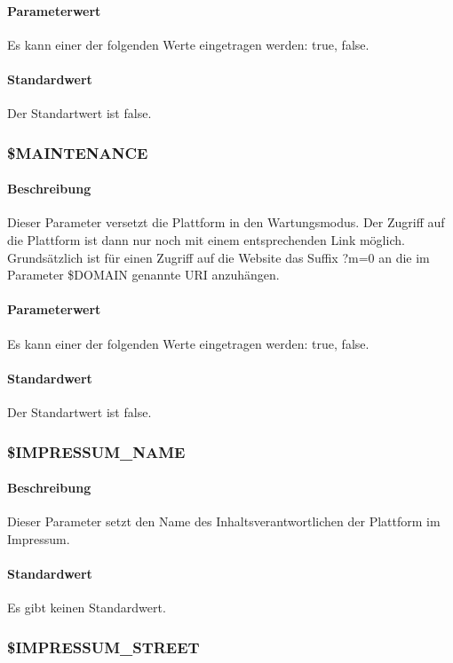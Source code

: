 \paragraph{Parameterwert}Es kann einer der folgenden Werte eingetragen werden: {\glqq true\grqq}, {\glqq false\grqq}.
\paragraph{Standardwert}Der Standartwert ist {\glqq false\grqq}.

\subsubsection{\$MAINTENANCE}
\paragraph{Beschreibung}Dieser Parameter versetzt die Plattform in den Wartungsmodus. Der Zugriff auf die Plattform ist dann nur noch mit einem entsprechenden Link möglich. Grundsätzlich ist für einen Zugriff auf die Website das Suffix {\glqq ?m=0\grqq} an die im Parameter {\glqq \$DOMAIN\grqq} genannte URI anzuhängen.
\paragraph{Parameterwert}Es kann einer der folgenden Werte eingetragen werden: {\glqq true\grqq}, {\glqq false\grqq}.
\paragraph{Standardwert}Der Standartwert ist {\glqq false\grqq}.

\subsubsection{\$IMPRESSUM\_NAME} \label{config:impressum-name}
\paragraph{Beschreibung}Dieser Parameter setzt den Name des Inhaltsverantwortlichen der Plattform im Impressum.
\paragraph{Standardwert}Es gibt keinen Standardwert.

\subsubsection{\$IMPRESSUM\_STREET} \label{config:impressum-street}
